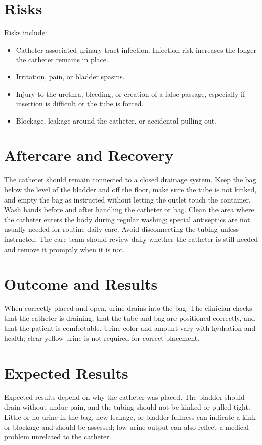 \section*{Risks}
Risks include:
\begin{itemize}
    \item Catheter-associated urinary tract infection. Infection risk increases the longer the catheter remains in place.
    \item Irritation, pain, or bladder spasms.
    \item Injury to the urethra, bleeding, or creation of a false passage, especially if insertion is difficult or the tube is forced.
    \item Blockage, leakage around the catheter, or accidental pulling out.
\end{itemize}

\section*{Aftercare and Recovery}
The catheter should remain connected to a closed drainage system. Keep the bag below the level of the bladder and off the floor, make sure the tube is not kinked, and empty the bag as instructed without letting the outlet touch the container. Wash hands before and after handling the catheter or bag. Clean the area where the catheter enters the body during regular washing; special antiseptics are not usually needed for routine daily care. Avoid disconnecting the tubing unless instructed. The care team should review daily whether the catheter is still needed and remove it promptly when it is not.

\section*{Outcome and Results}
When correctly placed and open, urine drains into the bag. The clinician checks that the catheter is draining, that the tube and bag are positioned correctly, and that the patient is comfortable. Urine color and amount vary with hydration and health; clear yellow urine is not required for correct placement.

\section*{Expected Results}
Expected results depend on why the catheter was placed. The bladder should drain without undue pain, and the tubing should not be kinked or pulled tight. Little or no urine in the bag, new leakage, or bladder fullness can indicate a kink or blockage and should be assessed; low urine output can also reflect a medical problem unrelated to the catheter.

